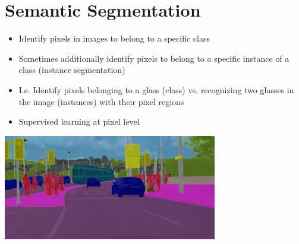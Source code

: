 \section{Semantic Segmentation}
\begin{itemize}
    \item Identify pixels in images to belong to a specific class
    \item Sometimes additionally identify pixels to belong to a specific instance of a class (instance segmentation)
    \item I.e. Identify pixels belonging to a glass (class) vs. recognizing two glasses in the image (instances) with their pixel regions
    \item Supervised learning at pixel level
\end{itemize}
\includegraphics[width=0.7\textwidth]{sections/SemanticSegmentation/img/example.png}

